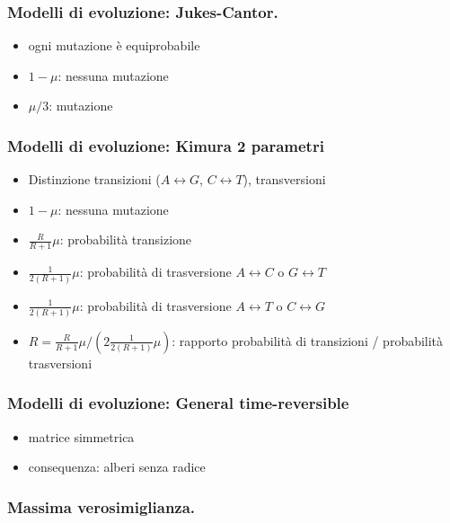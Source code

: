 \begin{frame}[fragile]
	\frametitle{Modelli di evoluzione: Jukes-Cantor.}
	\begin{itemize}
		\item
		      ogni mutazione è equiprobabile
		\item
		      $1-\mu$: nessuna mutazione
		\item
		      $\mu/3$: mutazione
	\end{itemize}
\end{frame}

\begin{frame}[fragile]
	\frametitle{Modelli di evoluzione: Kimura 2 parametri}
	\begin{itemize}
		\item
		      Distinzione transizioni ($A\leftrightarrow G$, $C\leftrightarrow T$), transversioni
		\item
		      $1-\mu$: nessuna mutazione
		\item
		      $\frac{R}{R+1}\mu$: probabilità transizione
		\item
		      $\frac{1}{2(R+1)}\mu$: probabilità di trasversione $A\leftrightarrow C$ o $G\leftrightarrow T$
		\item
		      $\frac{1}{2(R+1)}\mu$: probabilità di trasversione $A\leftrightarrow T$ o $C\leftrightarrow G$
		\item
		      $R = \frac{R}{R+1}\mu / \left(2 \frac{1}{2(R+1)}\mu \right)$: rapporto probabilità di transizioni / probabilità trasversioni
	\end{itemize}
\end{frame}

\begin{frame}[fragile]
	\frametitle{Modelli di evoluzione: General time-reversible}
	\begin{itemize}
		\item
		      matrice simmetrica
		\item
		      consequenza: alberi senza radice
	\end{itemize}
\end{frame}


\begin{frame}[fragile]
	\frametitle{Massima verosimiglianza.}
\end{frame}




